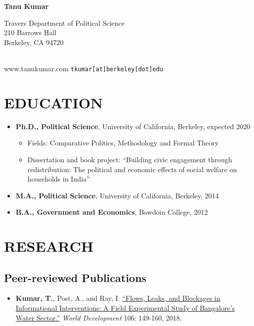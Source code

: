 \documentclass[11pt]{article}
\begin{document}
\thispagestyle{empty}
\begin{center}
\textbf{\Huge{Tanu Kumar}}
\end{center}

\begin{minipage}[t]{0.5\textwidth}
Travers Department of Political Science\\
210 Barrows Hall\\
Berkeley, CA 94720\\ \\
\end{minipage}
\begin{minipage}[t]{0.5\textwidth}
\begin{flushright}
www.tanukumar.com
\texttt{tkumar[at]berkeley[dot]edu}
\end{flushright}\end{minipage}
\section*{EDUCATION}

	\begin{itemize}[nosep]
		\item[] \textbf{Ph.D., Political Science}, University of California, Berkeley, expected 2020
		\begin{itemize}[nosep]
	\item[] Fields: Comparative Politics, Methodology and Formal Theory
			\item[]Dissertation and book project: ``Building civic engagement through redistribution: The political and economic effects of social welfare on households in India'' 
\end{itemize}
	\item[]  \textbf{M.A., Political Science}, University of California, Berkeley, 2014
	\item[] \textbf{B.A., Government and Economics}, Bowdoin College, 2012

\end{itemize}	
\vspace{3mm}
\section*{RESEARCH}

\subsection*{Peer-reviewed Publications}
\begin{itemize}
		\item[] \textbf{Kumar, T.}, Post, A., and Ray, I. \href{https://www.sciencedirect.com/science/article/pii/S0305750X18300329}{``Flows, Leaks, and Blockages in Informational Interventions: A Field Experimental Study of Bangalore's Water Sector.''} \textit{World Development} 106: 149-160, 2018.
\end{itemize}
\end{document}
